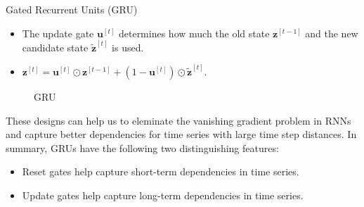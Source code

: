 \begin{vbframe}{Gated Recurrent Units (GRU)}
  \begin{itemize}
  \item The update gate $\mathbf{u}^{[t]}$ determines how much the old state $\mathbf{z}^{[t-1]}$ and the new candidate state $\tilde{\mathbf{z}}^{[t]}$ is used. 
  \item $\mathbf{z}^{[t]} = \mathbf{u}^{[t]} \odot \mathbf{z}^{[t-1]}  + (1 - \mathbf{u}^{[t]}) \odot \tilde{\mathbf{z}}^{[t]}.$
  \end{itemize}
  \begin{figure}
      \centering
      \caption{\footnotesize{GRU}}
  \end{figure}
 
  These designs can help us to eleminate the vanishing gradient problem in RNNs and capture better dependencies for time series with large time step distances. In summary, GRUs have the following two distinguishing features:
  \begin{itemize}
    \item Reset gates help capture short-term dependencies in time series.
    \item Update gates help capture long-term dependencies in time series.
  \end{itemize}
\end{vbframe}

